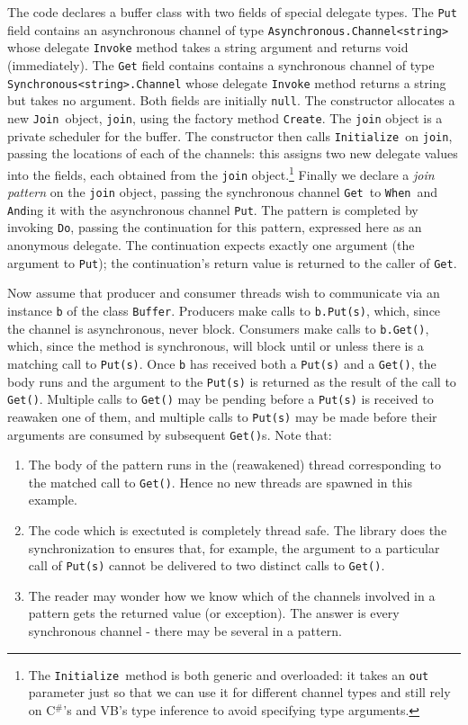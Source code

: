 \documentclass{article}
\newcommand{\csharp}{\texorpdfstring{\mbox{C$^\#$}}{C\#}}
\newcommand{\vb}{\mbox{VB}}
\newcommand{\cjoin}{{\texttt{Join}}}
\newcommand{\minitialize}{{\texttt{Initialize}}}
\newcommand{\mcreate}{{\texttt{Create}}}
\newcommand{\mwhen}{{\texttt{When}}}
\newcommand{\mand}{{\texttt{And}}}
\newcommand{\mdo}{{\texttt{Do}}}
\begin{document}
The code declares a buffer class with two fields of special delegate
types. The \verb+Put+ field contains an asynchronous channel of type \verb+Asynchronous.Channel<string>+ whose
delegate \verb+Invoke+ method takes a string argument and returns void (immediately).
The \verb+Get+ field contains contains a synchronous channel of type \verb+Synchronous<string>.Channel+ whose
delegate \verb+Invoke+ method returns a string but takes no argument.  Both
fields are initially \verb+null+.  The constructor allocates a new \cjoin\
object, \verb+join+, using the factory method \mcreate. The \verb+join+ object is a private scheduler
for the buffer.  The constructor then calls \minitialize\ on \verb+join+, passing the
locations of each of the channels: this assigns two new delegate
values into the fields, each obtained from the \verb+join+ object.\footnote{
The \minitialize\ method is both generic and overloaded: it takes an
{\tt out} parameter just so that we can use it for different channel
types and still rely on \csharp's and \vb's type inference to avoid
specifying type arguments.}  Finally we declare 
a \emph{join pattern} on the \verb+join+ object, passing the synchronous
channel \verb+Get+\ to \mwhen\, and {\mand}ing it with the
asynchronous channel \verb+Put+.  The pattern is completed by
invoking \mdo, passing the continuation for this pattern, expressed
here as an anonymous delegate. The continuation expects exactly one
argument (the argument to \verb+Put+); the continuation's return value
is returned to the caller of \verb+Get+. 

Now assume that producer and consumer threads wish to communicate via
an instance \verb|b| of the class \verb|Buffer|. Producers make calls
to \verb|b.Put(s)|, which, since the channel is asynchronous, never
block. Consumers make calls to \verb|b.Get()|, which, since the method
is synchronous, will block until or unless there is a matching call to
\verb|Put(s)|. Once \verb|b| has received both a \verb|Put(s)| and a
\verb|Get()|, the body runs and the argument to the \verb|Put(s)| is
returned as the result of the call to \verb|Get()|. Multiple calls to
\verb|Get()| may be pending before a \verb|Put(s)| is received to
reawaken one of them, and multiple calls to \verb|Put(s)| may be made
before their arguments are consumed by subsequent \verb|Get()|s. Note
that:
\begin{enumerate}
\item The body of the pattern runs in the (reawakened) thread
corresponding to the matched call to \verb|Get()|. Hence no new threads are
spawned in this example.
\item The code which is exectuted is
completely thread safe. The library does the synchronization to ensures
that, for example, the argument to a
particular call of \verb|Put(s)| cannot be delivered to two distinct calls to
\verb|Get()|. 
\item The reader may wonder how we know which of the channels involved
in a pattern gets the returned value (or exception).
The answer is every synchronous channel - there may be several in a pattern.
\end{enumerate}
\end{document}

